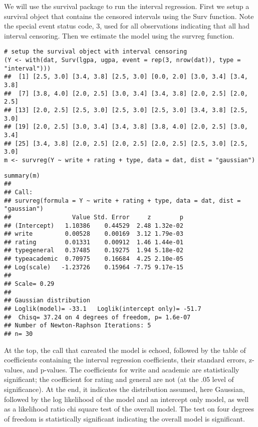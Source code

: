 \documentclass[a4paper,12pt]{article}
\begin{document}
We will use the survival package to run the interval regression. First we setup a survival object that contains the censored intervals using the Surv function. Note the special event status code, 3, used for all observations indicating that all had interval censoring. Then we estimate the model using the survreg function.
\begin{framed}
\begin{verbatim}
# setup the survival object with interval censoring
(Y <- with(dat, Surv(lgpa, ugpa, event = rep(3, nrow(dat)), type = "interval")))
##  [1] [2.5, 3.0] [3.4, 3.8] [2.5, 3.0] [0.0, 2.0] [3.0, 3.4] [3.4, 3.8]
##  [7] [3.8, 4.0] [2.0, 2.5] [3.0, 3.4] [3.4, 3.8] [2.0, 2.5] [2.0, 2.5]
## [13] [2.0, 2.5] [2.5, 3.0] [2.5, 3.0] [2.5, 3.0] [3.4, 3.8] [2.5, 3.0]
## [19] [2.0, 2.5] [3.0, 3.4] [3.4, 3.8] [3.8, 4.0] [2.0, 2.5] [3.0, 3.4]
## [25] [3.4, 3.8] [2.0, 2.5] [2.0, 2.5] [2.0, 2.5] [2.5, 3.0] [2.5, 3.0]
m <- survreg(Y ~ write + rating + type, data = dat, dist = "gaussian")
\end{verbatim}
\end{framed}
\begin{framed}
\begin{verbatim}summary(m)
## 
## Call:
## survreg(formula = Y ~ write + rating + type, data = dat, dist = "gaussian")
##                 Value Std. Error     z        p
## (Intercept)   1.10386    0.44529  2.48 1.32e-02
## write         0.00528    0.00169  3.12 1.79e-03
## rating        0.01331    0.00912  1.46 1.44e-01
## typegeneral   0.37485    0.19275  1.94 5.18e-02
## typeacademic  0.70975    0.16684  4.25 2.10e-05
## Log(scale)   -1.23726    0.15964 -7.75 9.17e-15
## 
## Scale= 0.29 
## 
## Gaussian distribution
## Loglik(model)= -33.1   Loglik(intercept only)= -51.7
## 	Chisq= 37.24 on 4 degrees of freedom, p= 1.6e-07 
## Number of Newton-Raphson Iterations: 5 
## n= 30
\end{verbatim}
\end{framed}
At the top, the call that careated the model is echoed, followed by the table of coefficients containing the interval regression coefficients, their standard errors, z-values, and p-values. The coefficients for write and academic are statistically significant; the coefficient for rating and general are not (at the .05 level of significance).
At the end, it indicates the distribution assumed, here Gaussian, followed by the log likelihood of the model and an intercept only model, as well as a likelihood ratio chi square test of the overall model. The test on four degrees of freedom is statistically significant indicating the overall model is significant.
\end{document}
